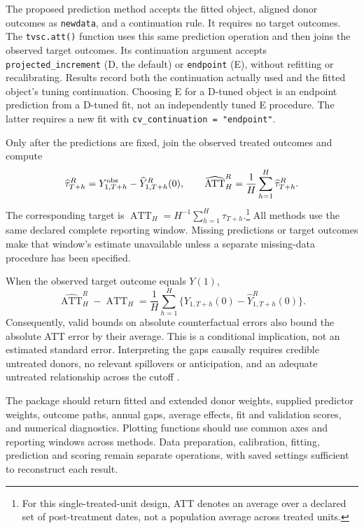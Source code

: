 \documentclass[11pt]{article}
\begin{document}
The proposed prediction method accepts the fitted object, aligned donor
outcomes as \texttt{newdata}, and a continuation rule. It requires no target
outcomes. The
\texttt{tvsc.att()} function uses this same prediction operation and then
joins the observed target outcomes. Its continuation argument accepts
\texttt{projected\_increment} (D, the default) or \texttt{endpoint} (E),
without refitting or recalibrating. Results record both the continuation
actually used and the fitted object's tuning continuation. Choosing E for
a D-tuned object is an endpoint prediction from a D-tuned fit, not an
independently tuned E procedure. The latter requires a new fit with
\texttt{cv\_continuation = "endpoint"}.

Only after the predictions are fixed, join the observed treated outcomes
and compute
\begin{equation}\label{eq:effects}
 \widehat\tau^R_{T+h}=Y^{\rm obs}_{1,T+h}
                         -\widehat Y^R_{1,T+h}(0),\qquad
 \widehat{\operatorname{ATT}}^R_H
                 =\frac1H\sum_{h=1}^H\widehat\tau^R_{T+h}.
\end{equation}
The corresponding target is
$\operatorname{ATT}_H=H^{-1}\sum_{h=1}^H\tau_{T+h}$.\footnote{For this
single-treated-unit design, ATT denotes an average over a declared set
of post-treatment dates, not a population average across treated units.}
All methods use the same declared complete reporting window. Missing
predictions or target outcomes make that window's estimate unavailable
unless a separate missing-data procedure has been specified.

When the observed target outcome equals $Y(1)$,
\[
 \widehat{\operatorname{ATT}}^R_H-\operatorname{ATT}_H
 =\frac1H\sum_{h=1}^H
       \{Y_{1,T+h}(0)-\widehat Y^R_{1,T+h}(0)\}.
\]
Consequently, valid bounds on absolute counterfactual errors also bound the
absolute ATT error by their average. This is a conditional implication,
not an estimated standard error. Interpreting the gaps causally requires
credible untreated donors, no relevant spillovers or anticipation, and
an adequate untreated relationship across the cutoff \cite{abadie2021}.

The package should return fitted and extended donor weights, supplied
predictor weights, outcome paths, annual gaps, average effects, fit and
validation scores, and numerical diagnostics. Plotting functions should
use common axes and reporting windows across methods. Data preparation,
calibration, fitting, prediction and scoring remain separate operations,
with saved settings sufficient to reconstruct each result.
\end{document}
